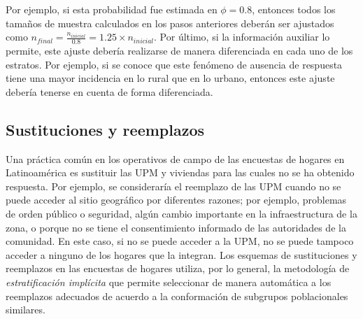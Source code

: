 \documentclass[
  12pt,
]{book}
\begin{document}
Por ejemplo, si esta probabilidad fue estimada en \(\phi = 0.8\), entonces todos los tamaños de muestra calculados en los pasos anteriores deberán ser ajustados como \(n_{final} = \frac{n_{inicial}}{0.8} = 1.25\times n_{inicial}\). Por último, si la información auxiliar lo permite, este ajuste debería realizarse de manera diferenciada en cada uno de los estratos. Por ejemplo, si se conoce que este fenómeno de ausencia de respuesta tiene una mayor incidencia en lo rural que en lo urbano, entonces este ajuste debería tenerse en cuenta de forma diferenciada.

\hypertarget{sustituciones-y-reemplazos}{%
\subsection{Sustituciones y reemplazos}\label{sustituciones-y-reemplazos}}

Una práctica común en los operativos de campo de las encuestas de hogares en Latinoamérica es sustituir las UPM y viviendas para las cuales no se ha obtenido respuesta. Por ejemplo, se consideraría el reemplazo de las UPM cuando no se puede acceder al sitio geográfico por diferentes razones; por ejemplo, problemas de orden público o seguridad, algún cambio importante en la infraestructura de la zona, o porque no se tiene el consentimiento informado de las autoridades de la comunidad. En este caso, si no se puede acceder a la UPM, no se puede tampoco acceder a ninguno de los hogares que la integran. Los esquemas de sustituciones y reemplazos en las encuestas de hogares utiliza, por lo general, la metodología de \emph{estratificación implícita} que permite seleccionar de manera automática a los reemplazos adecuados de acuerdo a la conformación de subgrupos poblacionales similares.
\end{document}
